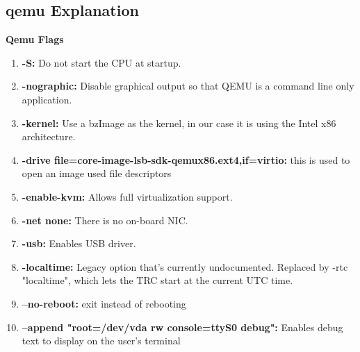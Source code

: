 \documentclass[letterpaper,10pt]{article}
\begin{document}
\subsection{qemu Explanation}
{\bfseries Qemu Flags}\\
\begin{enumerate}
\item {\textbf{-S:}} Do not start the CPU at startup.\\
\item {\textbf{-nographic:}} Disable graphical output so that QEMU is a command line only application.\\
\item {\textbf{-kernel:}} Use a bzImage as the kernel, in our case it is using the Intel x86 architecture.\\
\item {\textbf{-drive file=core-image-lsb-sdk-qemux86.ext4,if=virtio:}} this is used to open an image used file descriptors\\
\item {\textbf{-enable-kvm:}} Allows full virtualization support.\\
\item {\textbf{-net none:}} There is no on-board NIC.\\
\item {\textbf{-usb:}} Enables USB driver.\\
\item {\textbf{-localtime:}} Legacy option that's currently undocumented. Replaced by -rtc "localtime", which lets the TRC start at the current UTC time.\\
\item {\textbf{--no-reboot:}} exit instead of rebooting\\
\item {\textbf{--append "root=/dev/vda rw console=ttyS0 debug":}} Enables debug text to display on the user's terminal\\\\
\end{enumerate}

\end{document}
